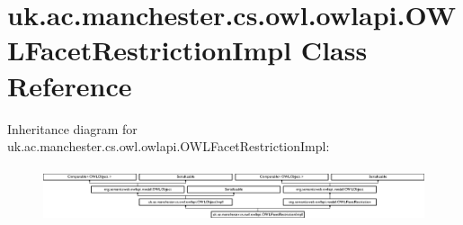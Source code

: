 \hypertarget{classuk_1_1ac_1_1manchester_1_1cs_1_1owl_1_1owlapi_1_1_o_w_l_facet_restriction_impl}{\section{uk.\-ac.\-manchester.\-cs.\-owl.\-owlapi.\-O\-W\-L\-Facet\-Restriction\-Impl Class Reference}
\label{classuk_1_1ac_1_1manchester_1_1cs_1_1owl_1_1owlapi_1_1_o_w_l_facet_restriction_impl}
}
Inheritance diagram for uk.\-ac.\-manchester.\-cs.\-owl.\-owlapi.\-O\-W\-L\-Facet\-Restriction\-Impl\-:\begin{figure}[H]
\begin{center}
\leavevmode
\includegraphics[height=1.623188cm]{classuk_1_1ac_1_1manchester_1_1cs_1_1owl_1_1owlapi_1_1_o_w_l_facet_restriction_impl}
\end{center}
\end{figure}

